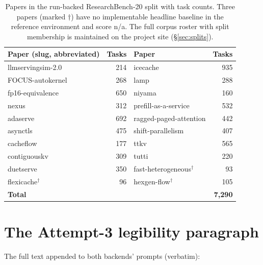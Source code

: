 \documentclass{article}
\begin{document}
\begin{table}[h]
\caption{Papers in the run-backed ResearchBench-20 split with task counts.
Three papers (marked $\dagger$) have no implementable headline baseline in the
reference environment and score n/a. The full corpus roster with split
membership is maintained on the project site (\S\ref{sec:splits}).}
\begin{center}
\small
\begin{tabular}{lr@{\qquad}lr}
\toprule
\textbf{Paper (slug, abbreviated)} & \textbf{Tasks} & \textbf{Paper} & \textbf{Tasks} \\
\midrule
llmservingsim-2.0 & 214 & icecache & 935 \\
FOCUS-autokernel & 268 & lamp & 288 \\
fp16-equivalence & 650 & niyama & 160 \\
nexus & 312 & prefill-as-a-service & 532 \\
adaserve & 692 & ragged-paged-attention & 442 \\
asynctls & 475 & shift-parallelism & 407 \\
cacheflow & 177 & ttkv & 565 \\
contiguouskv & 309 & tutti & 220 \\
duetserve & 350 & fast-heterogeneous$^\dagger$ & 93 \\
flexicache$^\dagger$ & 96 & hexgen-flow$^\dagger$ & 105 \\
\midrule
\multicolumn{2}{l}{\textbf{Total}} & & \textbf{7{,}290} \\
\bottomrule
\end{tabular}
\end{center}
\end{table}

\section{The Attempt-3 legibility paragraph}
\label{app:blurb}

The full text appended to both backends' prompts (verbatim):
\end{document}
